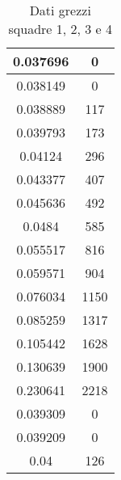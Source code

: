 \begin{table}[H]
\begin{tabular}{|c|c|}
    0.037696         & 0          \\ \hline
    0.038149         & 0          \\ \hline
    0.038889         & 117        \\ \hline
    0.039793         & 173        \\ \hline
    0.04124          & 296        \\ \hline
    0.043377         & 407        \\ \hline
    0.045636         & 492        \\ \hline
    0.0484           & 585        \\ \hline
    0.055517         & 816        \\ \hline
    0.059571         & 904        \\ \hline
    0.076034         & 1150       \\ \hline
    0.085259         & 1317       \\ \hline
    0.105442         & 1628       \\ \hline
    0.130639         & 1900       \\ \hline
    0.230641         & 2218       \\ \hline
    0.039309         & 0          \\ \hline
    0.039209         & 0          \\ \hline
    0.04             & 126        \\ \hline
    \end{tabular}
    \caption{Dati grezzi squadre 1, 2, 3 e 4}
\end{table}
